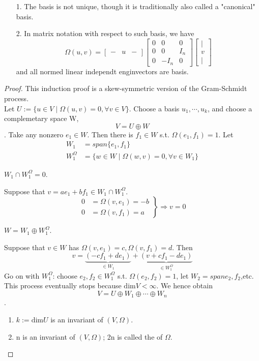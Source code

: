 \documentclass[4paper]{article}
\begin{document}
\begin{enumerate}
\item[1.] The basis is not unique, though it is traditionally also called a "canonical" basis.
\item[2.] In matrix notation with respect to such basis, we have 
\begin{equation*}
\Omega(u,v)=
\begin{bmatrix}
- & u & -
\end{bmatrix}
\begin{bmatrix}
0 & 0 & 0 \\
0 & 0 & I_n \\
0 &-I_n& 0
\end{bmatrix}
\begin{bmatrix}
| \\
v \\
|
\end{bmatrix}
\end{equation*}
and all normed linear independt enginvectors are basis. 
\end{enumerate}

\begin{proof}
This induction proof is a skew-symmetric version of the Gram-Schmidt process. \\ Let $U:=\{u\in V\mid 
\Omega(u,v)=0,\forall v\in V\}$. Choose a basis $u_1,\cdots,u_k$, and choose a complemetary space W,
$$V=U\oplus W$$. Take any nonzero $e_1\in W$. Then there is $f_1\in W$ s.t. $\Omega(e_1,f_1)=1$. Let
\begin{align*}
W_1 &= span\{e_1,f_1\} \\
W_1^{\Omega}&=\{w\in W\mid \Omega(w,v)=0,\forall v\in W_1\}
\end{align*}
\begin{claim}
$W_1\cap W_1^{\Omega}={0}$.
\end{claim}
Suppose that $v=ae_1+bf_1\in W_1\cap W_1^{\Omega}$.
\begin{equation*}
 \left.\begin{aligned}
        0&=\Omega(v,e_1)=-b\\
        0&=\Omega(v,f_1)=a
       \end{aligned}
 \right\}
 \Rightarrow v=0
\end{equation*}
\begin{claim}
$W=W_1\oplus W_1^\Omega$.
\end{claim}
Suppose that $v\in W$ has $\Omega(v,e_1)=c, \Omega(v,f_1)=d$. Then
\[
 v = \underbrace{(-cf_1+de_1)}_{\in W_1}
   + \underbrace{(v+cf_1-de_1)}_{\in W_1^\Omega}
\]
Go on with $W_1^\Omega$: choose $e_2,f_2\in W_1^\Omega$ s.t. $\Omega(e_2,f_2)=1$, let $W_2=span{e_2,
f_2}$,etc. This process eventually stops because $\text{dim}V<\infty$. We hence obtain $$V=U\oplus
W_1\oplus \cdots \oplus W_n$$.
\begin{enumerate}
\item $k:=\text{dim}U$ is an invariant of $(V,\Omega)$.\\
\item n is an invariant of $(V,\Omega)$; 2n is called the  of $\Omega$.
\end{enumerate}
\end{proof}
\end{document}
